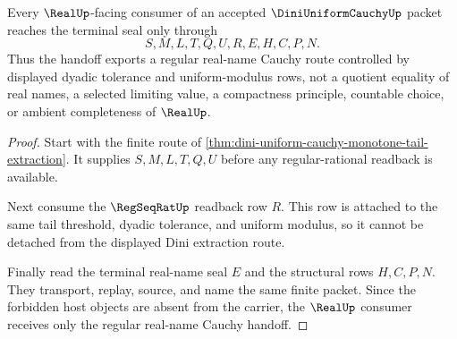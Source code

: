 \begin{theorem}
\label{thm:dini-uniform-cauchy-regular-real-handoff}
Every $\RealUp$-facing consumer of an accepted $\DiniUniformCauchyUp$ packet reaches the terminal seal only through
$$
S,M,L,T,Q,U,R,E,H,C,P,N .
$$
Thus the handoff exports a regular real-name Cauchy route controlled by displayed dyadic tolerance and uniform-modulus rows, not a quotient equality of real names, a selected limiting value, a compactness principle, countable choice, or ambient completeness of $\RealUp$.
\end{theorem}
\begin{proof}
Start with the finite route of \autoref{thm:dini-uniform-cauchy-monotone-tail-extraction}. It supplies $S,M,L,T,Q,U$ before any regular-rational readback is available.

Next consume the $\RegSeqRatUp$ readback row $R$. This row is attached to the same tail threshold, dyadic tolerance, and uniform modulus, so it cannot be detached from the displayed Dini extraction route.

Finally read the terminal real-name seal $E$ and the structural rows $H,C,P,N$. They transport, replay, source, and name the same finite packet. Since the forbidden host objects are absent from the carrier, the $\RealUp$ consumer receives only the regular real-name Cauchy handoff.
\end{proof}




